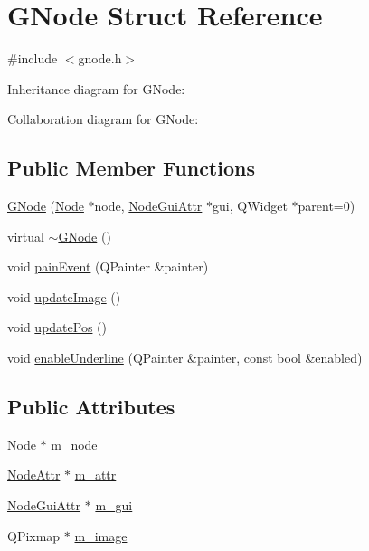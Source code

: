\hypertarget{struct_g_node}{}\section{G\+Node Struct Reference}
\label{struct_g_node}


{\ttfamily \#include $<$gnode.\+h$>$}



Inheritance diagram for G\+Node\+:


Collaboration diagram for G\+Node\+:
\subsection*{Public Member Functions}
\begin{DoxyCompactItemize}
\item 
\mbox{\hyperlink{struct_g_node_a2344be00333e7e3c1e481320dab0ab6c}{G\+Node}} (\mbox{\hyperlink{class_node}{Node}} $\ast$node, \mbox{\hyperlink{struct_node_gui_attr}{Node\+Gui\+Attr}} $\ast$gui, Q\+Widget $\ast$parent=0)
\item 
virtual \mbox{\hyperlink{struct_g_node_a126f44e9c70024d22e3766e9188858e0}{$\sim$\+G\+Node}} ()
\item 
void \mbox{\hyperlink{struct_g_node_a380b1efbcfae97d1746ce7f30f983742}{pain\+Event}} (Q\+Painter \&painter)
\item 
void \mbox{\hyperlink{struct_g_node_a131f3025a4d61433e58b5d7dbe702820}{update\+Image}} ()
\item 
void \mbox{\hyperlink{struct_g_node_a3c38a45a7b98a63d3f240d8e62032fb8}{update\+Pos}} ()
\item 
void \mbox{\hyperlink{struct_g_node_a1828c2a21037df0a85be72c1c65266dd}{enable\+Underline}} (Q\+Painter \&painter, const bool \&enabled)
\end{DoxyCompactItemize}
\subsection*{Public Attributes}
\begin{DoxyCompactItemize}
\item 
\mbox{\hyperlink{class_node}{Node}} $\ast$ \mbox{\hyperlink{struct_g_node_a1f5acd0ae89f506fdbd8674b0cda648c}{m\+\_\+node}}
\item 
\mbox{\hyperlink{struct_node_attr}{Node\+Attr}} $\ast$ \mbox{\hyperlink{struct_g_node_a9af79b0be58beeca8e76eef4d1798555}{m\+\_\+attr}}
\item 
\mbox{\hyperlink{struct_node_gui_attr}{Node\+Gui\+Attr}} $\ast$ \mbox{\hyperlink{struct_g_node_a3883c1648b5f4b39872eac62d0d9f74d}{m\+\_\+gui}}
\item 
Q\+Pixmap $\ast$ \mbox{\hyperlink{struct_g_node_a77e0c9572f6f27150ed75b3a55120d08}{m\+\_\+image}}
\end{DoxyCompactItemize}


